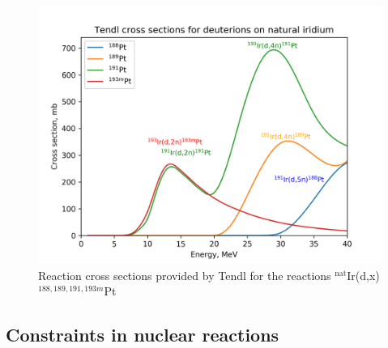 \documentclass[a4paper,11pt,twoside]{book}
\begin{document}
\begin{figure}
    \centering
    \includegraphics{Theory/reactionchannels_pt.png}
    \caption{Reaction cross sections provided by Tendl for the reactions $^\text{nat}$Ir(d,x)$^{188,189,191,193m}$Pt}
    \label{fig:pt_reactionchannels}
\end{figure}

\subsection{Constraints in nuclear reactions}

\end{document}
